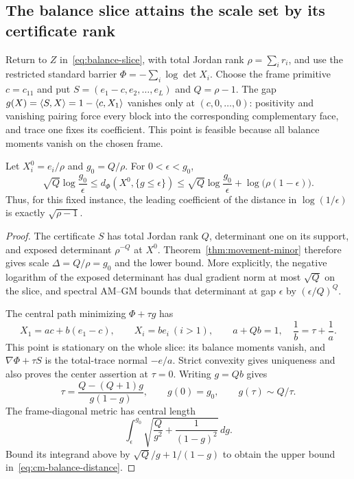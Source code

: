\subsection{The balance slice attains the scale set by its certificate rank}

Return to $Z$ in~\eqref{eq:balance-slice}, with total Jordan rank
$\rho=\sum_i r_i$, and use the restricted standard barrier
$\Phi=-\sum_i\log\det X_i$.
Choose the frame primitive $c=c_{11}$ and put
$S=(e_1-c,e_2,\ldots,e_L)$ and $Q=\rho-1$.
The gap $g(X)=\langle S,X\rangle=1-\langle c,X_1\rangle$ vanishes only at
$(c,0,\ldots,0)$: positivity and vanishing pairing force every block
into the corresponding complementary face, and trace one fixes its
coefficient.  This point is feasible because all balance moments
vanish on the chosen frame.

\begin{proposition}
\label{prop:cm-balance}
Let $X_i^0=e_i/\rho$ and $g_0=Q/\rho$.  For $0<\epsilon<g_0$,
\begin{equation}\label{eq:cm-balance-distance}
 \sqrt Q\log\frac{g_0}{\epsilon}
 \leq d_\Phi(X^0,\{g\leq\epsilon\})
 \leq\sqrt Q\log\frac{g_0}{\epsilon}
       +\log\bigl(\rho(1-\epsilon)\bigr).
\end{equation}
Thus, for this fixed instance, the leading coefficient of the distance
in $\log(1/\epsilon)$ is exactly $\sqrt{\rho-1}$.
\end{proposition}
\begin{proof}
The certificate $S$ has total Jordan rank $Q$, determinant one on its
support, and exposed determinant $\rho^{-Q}$ at $X^0$.
Theorem~\ref{thm:movement-minor} therefore gives scale
$\Delta=Q/\rho=g_0$ and the lower bound.  More explicitly, the
negative logarithm of the exposed determinant has dual gradient norm
at most $\sqrt Q$ on the slice, and spectral AM--GM bounds that
determinant at gap $\epsilon$ by $(\epsilon/Q)^Q$.

The central path minimizing $\Phi+\tau g$ has
\[
 X_1=ac+b(e_1-c),\qquad X_i=be_i\ (i>1),\qquad
 a+Qb=1,\quad \frac1b=\tau+\frac1a.
\]
This point is stationary on the whole slice: its balance moments
vanish, and $\nabla\Phi+\tau S$ is the total-trace normal $-e/a$.  Strict convexity gives uniqueness and also proves the
center assertion at $\tau=0$.  Writing $g=Qb$ gives
\[
 \tau=\frac{Q-(Q+1)g}{g(1-g)},\qquad
 g(0)=g_0,\qquad g(\tau)\sim Q/\tau.
\]
The frame-diagonal metric has central length
\[
 \int_\epsilon^{g_0}
 \sqrt{\frac Q{g^2}+\frac1{(1-g)^2}}\,dg.
\]
Bound its integrand above by $\sqrt Q/g+1/(1-g)$ to obtain
the upper bound in~\eqref{eq:cm-balance-distance}.
\end{proof}

